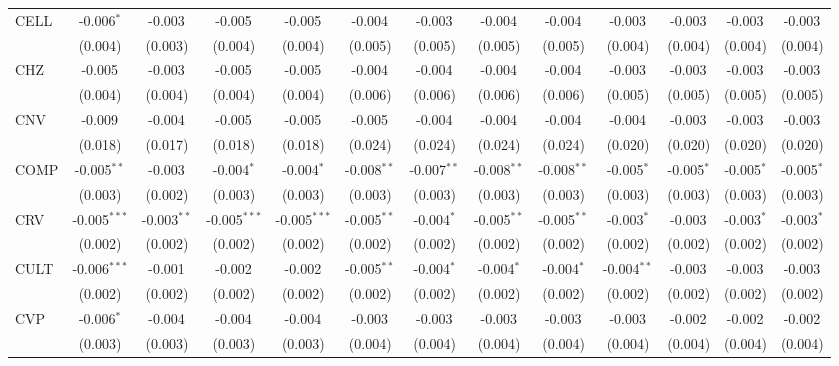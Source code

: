 \begin{table}[!htbp]
\begin{tabular}{@{\extracolsep{5pt}}lcccccccccccc}
 CELL & -0.006$^{*}$ & -0.003$^{}$ & -0.005$^{}$ & -0.005$^{}$ & -0.004$^{}$ & -0.003$^{}$ & -0.004$^{}$ & -0.004$^{}$ & -0.003$^{}$ & -0.003$^{}$ & -0.003$^{}$ & -0.003$^{}$ \\
  & (0.004) & (0.003) & (0.004) & (0.004) & (0.005) & (0.005) & (0.005) & (0.005) & (0.004) & (0.004) & (0.004) & (0.004) \\
 CHZ & -0.005$^{}$ & -0.003$^{}$ & -0.005$^{}$ & -0.005$^{}$ & -0.004$^{}$ & -0.004$^{}$ & -0.004$^{}$ & -0.004$^{}$ & -0.003$^{}$ & -0.003$^{}$ & -0.003$^{}$ & -0.003$^{}$ \\
  & (0.004) & (0.004) & (0.004) & (0.004) & (0.006) & (0.006) & (0.006) & (0.006) & (0.005) & (0.005) & (0.005) & (0.005) \\
 CNV & -0.009$^{}$ & -0.004$^{}$ & -0.005$^{}$ & -0.005$^{}$ & -0.005$^{}$ & -0.004$^{}$ & -0.004$^{}$ & -0.004$^{}$ & -0.004$^{}$ & -0.003$^{}$ & -0.003$^{}$ & -0.003$^{}$ \\
  & (0.018) & (0.017) & (0.018) & (0.018) & (0.024) & (0.024) & (0.024) & (0.024) & (0.020) & (0.020) & (0.020) & (0.020) \\
 COMP & -0.005$^{**}$ & -0.003$^{}$ & -0.004$^{*}$ & -0.004$^{*}$ & -0.008$^{**}$ & -0.007$^{**}$ & -0.008$^{**}$ & -0.008$^{**}$ & -0.005$^{*}$ & -0.005$^{*}$ & -0.005$^{*}$ & -0.005$^{*}$ \\
  & (0.003) & (0.002) & (0.003) & (0.003) & (0.003) & (0.003) & (0.003) & (0.003) & (0.003) & (0.003) & (0.003) & (0.003) \\
 CRV & -0.005$^{***}$ & -0.003$^{**}$ & -0.005$^{***}$ & -0.005$^{***}$ & -0.005$^{**}$ & -0.004$^{*}$ & -0.005$^{**}$ & -0.005$^{**}$ & -0.003$^{*}$ & -0.003$^{}$ & -0.003$^{*}$ & -0.003$^{*}$ \\
  & (0.002) & (0.002) & (0.002) & (0.002) & (0.002) & (0.002) & (0.002) & (0.002) & (0.002) & (0.002) & (0.002) & (0.002) \\
 CULT & -0.006$^{***}$ & -0.001$^{}$ & -0.002$^{}$ & -0.002$^{}$ & -0.005$^{**}$ & -0.004$^{*}$ & -0.004$^{*}$ & -0.004$^{*}$ & -0.004$^{**}$ & -0.003$^{}$ & -0.003$^{}$ & -0.003$^{}$ \\
  & (0.002) & (0.002) & (0.002) & (0.002) & (0.002) & (0.002) & (0.002) & (0.002) & (0.002) & (0.002) & (0.002) & (0.002) \\
 CVP & -0.006$^{*}$ & -0.004$^{}$ & -0.004$^{}$ & -0.004$^{}$ & -0.003$^{}$ & -0.003$^{}$ & -0.003$^{}$ & -0.003$^{}$ & -0.003$^{}$ & -0.002$^{}$ & -0.002$^{}$ & -0.002$^{}$ \\
  & (0.003) & (0.003) & (0.003) & (0.003) & (0.004) & (0.004) & (0.004) & (0.004) & (0.004) & (0.004) & (0.004) & (0.004) \\

\end{tabular}
\end{table}
